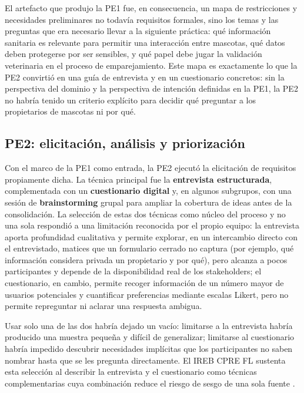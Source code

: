 \documentclass[journal,onecolumn]{IEEEtran}
\begin{document}
El artefacto que produjo la PE1 fue, en consecuencia, un mapa de restricciones y
necesidades preliminares no todavía requisitos formales, sino los temas y las preguntas
que era necesario llevar a la siguiente práctica: qué información sanitaria es relevante
para permitir una interacción entre mascotas, qué datos deben protegerse por ser sensibles,
y qué papel debe jugar la validación veterinaria en el proceso de emparejamiento. Este mapa
es exactamente lo que la PE2 convirtió en una guía de entrevista y en un cuestionario
concretos: sin la perspectiva del dominio y la perspectiva de intención definidas en la
PE1, la PE2 no habría tenido un criterio explícito para decidir qué preguntar a los
propietarios de mascotas ni por qué.

\subsection{PE2: elicitación, análisis y priorización}

Con el marco de la PE1 como entrada, la PE2 ejecutó la elicitación de requisitos
propiamente dicha. La técnica principal fue la \textbf{entrevista estructurada},
complementada con un \textbf{cuestionario digital} y, en algunos subgrupos, con una sesión
de \textbf{brainstorming} grupal para ampliar la cobertura de ideas antes de la
consolidación. La selección de estas dos técnicas como núcleo del proceso y no una
sola respondió a una limitación reconocida por el propio equipo: la entrevista aporta
profundidad cualitativa y permite explorar, en un intercambio directo con el entrevistado,
matices que un formulario cerrado no captura (por ejemplo, qué información considera
privada un propietario y por qué), pero alcanza a pocos participantes y depende de la
disponibilidad real de los stakeholders; el cuestionario, en cambio, permite recoger
información de un número mayor de usuarios potenciales y cuantificar preferencias
mediante escalas Likert, pero no permite repreguntar ni aclarar una respuesta ambigua. 

Usar solo una de las dos habría dejado un vacío: limitarse a la entrevista habría producido una
muestra pequeña y difícil de generalizar; limitarse al cuestionario habría impedido
descubrir necesidades implícitas que los participantes no saben nombrar hasta que se les
pregunta directamente. El IREB CPRE FL sustenta esta selección al describir la entrevista y
el cuestionario como técnicas complementarias cuya combinación reduce el riesgo de sesgo de
una sola fuente \cite{ireb2026}.
\end{document}
